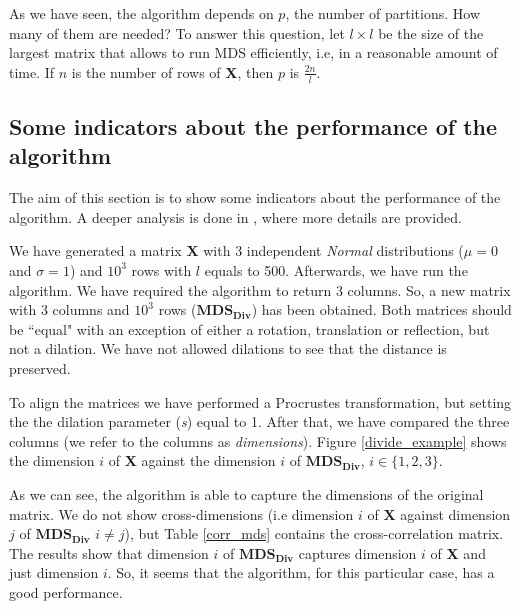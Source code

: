 \documentclass[11pt]{report}
\begin{document}
As we have seen, the algorithm depends on $p$, the number of partitions. How 
many of them are needed? To answer this question, let $l \times l$ be the 
size of the largest matrix that allows to run MDS efficiently, i.e, in a 
reasonable amount of time. If $n$ is the number of rows 
of \textbf{X}, then $p$ is $\frac{2n}{l}$. 

\subsection{Some indicators about the performance of the algorithm}
\label{chap:ind_div}
The aim of this section is to show some indicators about the performance of the
algorithm. A deeper analysis is done in , where more details are
provided.

\indent We have generated a matrix \textbf{X} with 3 independent \textit{Normal} 
distributions ($\mu = 0$ and $\sigma = 1$) and $10^3$ rows with $l$ equals to 500. 
Afterwards, we have run the algorithm. We have required the algorithm to 
return 3 columns. So, a new matrix with 3 columns and $10^3$ rows 
($\mathbf{MDS_{Div}}$) has been obtained. Both matrices should be ``equal" 
with an exception of either a rotation, translation or reflection, but 
not a dilation. We have not allowed dilations to see that the distance is 
preserved.

\indent To align the matrices we have performed a Procrustes transformation, but 
setting the the dilation parameter (\textit{s}) equal to 1. 
After that, we have compared the three columns (we refer to the columns as 
\textit{dimensions}). Figure \ref{divide_example} shows the dimension
$i$ of \textbf{X} against the dimension $i$ of $\mathbf{MDS_{Div}}$, 
$i \in \{1,2,3\}$. 

\indent As we can see, the algorithm is able to capture the dimensions of the 
original matrix. We do not show cross-dimensions (i.e dimension $i$ of \textbf{X}
against dimension $j$ of $\mathbf{MDS_{Div}}$ $ i \neq j$), but Table 
\ref{corr_mds} contains the cross-correlation matrix. The results 
show that dimension  $i$ of  $\mathbf{MDS_{Div}}$ captures dimension 
$i$ of \textbf{X} and just dimension $i$. So, it seems that the algorithm, for 
this particular case, has a good performance.
\end{document}
